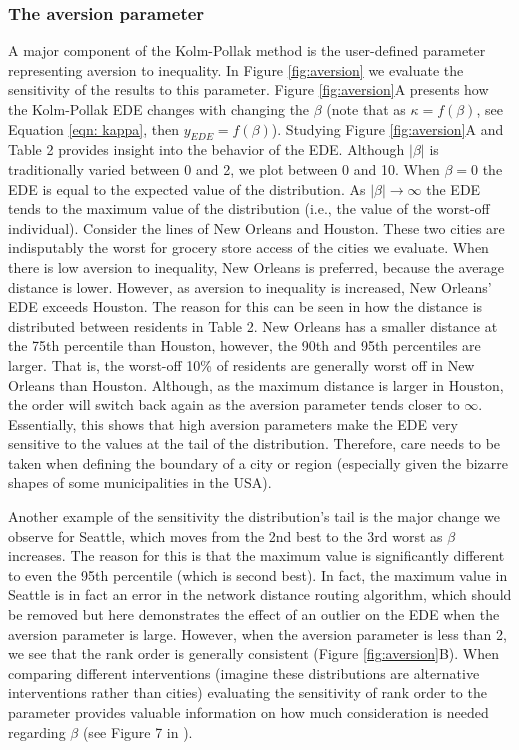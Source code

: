 \documentclass[final,3p,times,onecolumn,sort&compress]{elsarticle}
\begin{document}
\subsubsection{The aversion parameter}
\label{sec:aversion}
A major component of the Kolm-Pollak method is the user-defined parameter representing aversion to inequality.
In Figure \ref{fig:aversion} we evaluate the sensitivity of the results to this parameter.
Figure \ref{fig:aversion}A presents how the Kolm-Pollak EDE changes with changing the $\beta$ (note that as $\kappa=f(\beta)$, see Equation \ref{eqn: kappa}, then $y_{EDE}=f(\beta)$).
Studying Figure \ref{fig:aversion}A and Table 2 provides insight into the behavior of the EDE.
Although $\left|\beta\right|$ is traditionally varied between 0 and 2, we plot between 0 and 10.
When $\beta=0$ the EDE is equal to the expected value of the distribution.
As $\left|\beta\right| \rightarrow \infty$ the EDE tends to the maximum value of the distribution (i.e., the value of the worst-off individual).
Consider the lines of New Orleans and Houston.
These two cities are indisputably the worst for grocery store access of the cities we evaluate.
When there is low aversion to inequality, New Orleans is preferred, because the average distance is lower.
However, as aversion to inequality is increased, New Orleans' EDE exceeds Houston.
The reason for this can be seen in how the distance is distributed between residents in Table 2.
New Orleans has a smaller distance at the 75th percentile than Houston, however, the 90th and 95th percentiles are larger.
That is, the worst-off 10\% of residents are generally worst off in New Orleans than Houston.
Although, as the maximum distance is larger in Houston, the order will switch back again as the aversion parameter tends closer to $\infty$.
Essentially, this shows that high aversion parameters make the EDE very sensitive to the values at the tail of the distribution.
Therefore, care needs to be taken when defining the boundary of a city or region (especially given the bizarre shapes of some municipalities in the USA).

Another example of the sensitivity the distribution's tail is the major change we observe for Seattle, which moves from the 2nd best to the 3rd worst as $\beta$ increases.
The reason for this is that the maximum value is significantly different to even the 95th percentile (which is second best).
In fact, the maximum value in Seattle is in fact an error in the network distance routing algorithm, which should be removed but here demonstrates the effect of an outlier on the EDE when the aversion parameter is large.
However, when the aversion parameter is less than 2, we see that the rank order is generally consistent (Figure \ref{fig:aversion}B).
When comparing different interventions (imagine these distributions are alternative interventions rather than cities) evaluating the sensitivity of rank order to the parameter provides valuable information on how much consideration is needed regarding $\beta$ (see Figure 7 in \cite{Atkinson1970-mr}).
\end{document}
